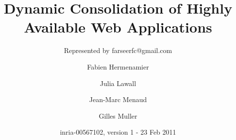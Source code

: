 

\usepackage{tikz} 
\usepackage{mathptmx}
\usepackage[T1]{fontenc}
\usepackage[latin1]{inputenc}
\usepackage{color}
\usepackage{amsmath}
\usepackage{amssymb}



\def\beamer@linkspace#1{%
  \begin{pgfpicture}{0pt}{-1.5pt}{#1}{5.5pt}
    \pgfsetfillopacity{0}
    \pgftext[x=0pt,y=-1.5pt]{.}
    \pgftext[x=#1,y=5.5pt]{.}
  \end{pgfpicture}}


\usepackage[english]{babel}




\newcommand{\Plasma}[0]{\textbf\emph{\large Plasma }}
\newcommand{\br}[0]{\par\vskip15pt\par}




\title[Plasma]{Dynamic Consolidation of Highly Available Web Applications}

\subtitle{Represented by farseerfc@gmail.com}

\author[Fabien, Julia, Jean-Marc, Gilles]{
	Fabien Hermenamier \and
	Julia Lawall \and 
	Jean-Marc Menaud \and 
	Gilles Muller  
}


\date[inria 2011 | GC@SE.SJTU ]{inria-00567102, version 1 - 23 Feb 2011}


\frame{\maketitle}


